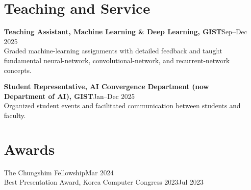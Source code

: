\documentclass[10pt,a4paper]{article}
\begin{document}
\section{Teaching and Service}
\textbf{Teaching Assistant, Machine Learning \& Deep Learning, GIST}\hfill Sep--Dec 2025\\
Graded machine-learning assignments with detailed feedback and taught fundamental
neural-network, convolutional-network, and recurrent-network concepts.\par
\textbf{Student Representative, AI Convergence Department (now Department of AI), GIST}\hfill Jan--Dec 2025\\
Organized student events and facilitated communication between students and faculty.

\section{Awards}
The Chungshim Fellowship\hfill Mar 2024\\
Best Presentation Award, Korea Computer Congress 2023\hfill Jul 2023
\end{document}
